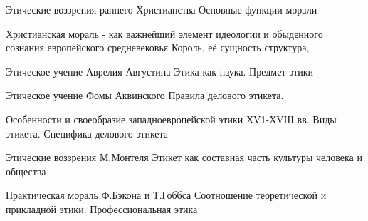 \documentclass[
	14pt,
	a4paper,
	]
	{scrartcl}
\begin{document}
\vfill

\newpage


\shapk
{}
\setcounter{zad}{0}

\vfill
\z Этические воззрения раннего Христианства
 \vfill
\z Основные функции морали
 \vfill

\vfill

\newpage


\shapk
{}
\setcounter{zad}{0}

\vfill
\z Христианская мораль - как важнейший элемент идеологии и обыденного сознания европейского средневековья
 \vfill
\z Король, её сущность структура,
 \vfill

\vfill

\newpage


\shapk
{}
\setcounter{zad}{0}

\vfill
\z Этическое учение Аврелия Августина
 \vfill
\z Этика как наука. Предмет этики
 \vfill

\vfill

\newpage


\shapk
{}
\setcounter{zad}{0}

\vfill
\z Этическое учение Фомы Аквинского
 \vfill
\z Правила делового этикета.
 \vfill

\vfill

\newpage


\shapk
{}
\setcounter{zad}{0}

\vfill
\z Особенности и своеобразие западноевропейской этики ХV1-ХVШ вв.
 \vfill
\z Виды этикета. Специфика делового этикета
 \vfill

\vfill

\newpage


\shapk
{}
\setcounter{zad}{0}

\vfill
\z Этические воззрения М.Монтеля
 \vfill
\z Этикет как составная часть культуры человека и общества
 \vfill

\vfill

\newpage


\shapk
{}
\setcounter{zad}{0}

\vfill
\z Практическая мораль Ф.Бэкона и Т.Гоббса
 \vfill
\z Соотношение теоретической и прикладной этики. Профессиональная этика
 \vfill

\vfill

\newpage


\shapk
{}
\setcounter{zad}{0}
\end{document}

